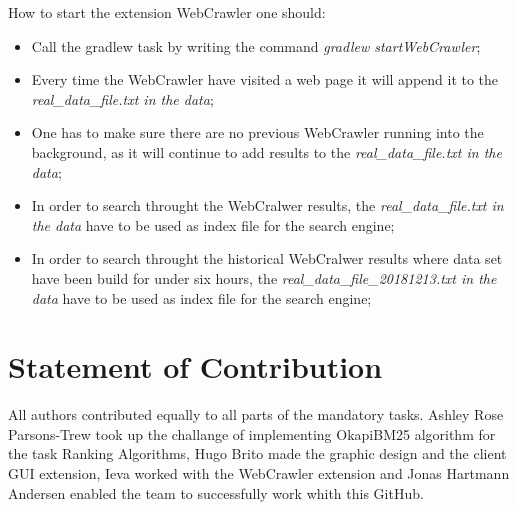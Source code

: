 How to start the extension WebCrawler one should:
\begin{itemize}

\item Call the gradlew task by writing the command  \textit{gradlew startWebCrawler};
\item Every time the WebCrawler have visited a web page it will append it to the \textit{real\_data\_file.txt in the data};
\item One has to make sure there are no previous WebCrawler running into the background, as it will continue to add results to the \textit{real\_data\_file.txt in the data};
\item In order to search throught the WebCralwer results, the \textit{real\_data\_file.txt in the data} have to be used as index file for the search engine;
\item In order to search throught the historical WebCralwer results where data set have been build for under six hours, the \textit{real\_data\_file\_20181213.txt in the data} have to be used as index file for the search engine;

\end{itemize}

\section{Statement of Contribution}
\label{sec:Statement of Contribution}
All authors contributed equally to all parts of the mandatory tasks. Ashley Rose Parsons-Trew took up the challange of implementing OkapiBM25 algorithm for the task Ranking Algorithms, Hugo Brito made the graphic design and the client GUI extension, Ieva worked with the WebCrawler extension and Jonas Hartmann Andersen enabled the team to successfully work whith this GitHub.
